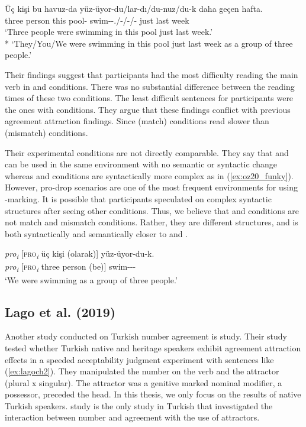 \ea \label{ex:oz20}
    \gll \"U\c{c} ki\c{s}i bu havuz-da y\"uz-\"uyor-{du/lar-d{\i}/du-nuz/du-k} daha ge\c{c}en hafta.\\
    three person this pool-\Loc{} swim-\Impf-{\Pst.\Tsg/\Tpl-\Pst/\Pst-\Spl/\Pst-\Fpl} just last week\\
    \glt `Three people were swimming in this pool just last week.'\\*
    `They/You/We were swimming in this pool just last week as a group of three people.'
\z

Their findings suggest that participants had the most difficulty reading the main verb in \Spl{} and \Tpl{} conditions. There was no substantial difference between the reading times of these two conditions. The least difficult sentences for participants were the ones with \Tsg{} conditions. They argue that these findings conflict with previous agreement attraction findings. Since \Tpl{} (match) conditions read slower than \Tsg{} (mismatch) conditions.

Their experimental conditions are not directly comparable. They say that \Tsg{} and \Tpl{} can be used in the same environment with no semantic or syntactic change whereas \Fpl{} and \Spl{} conditions are syntactically more complex as in (\ref{ex:oz20_funky}). However, pro-drop scenarios are one of the most frequent environments for using \Tpl{}-marking. It is possible that participants speculated on complex syntactic structures after seeing other conditions. Thus, we believe that \Tpl{} and \Tsg{} conditions are not match and mismatch conditions. Rather, they are different structures, and \Tpl{} is both syntactically and semantically closer to \Fpl{} and \Spl{}.

\ea \label{ex:oz20_funky}
    \gll \emph{pro\textsubscript{\it i}} [\textsc{pro}\textsubscript{\it i} \"u\c{c} ki\c{s}i (olarak)] y\"uz-\"uyor-du-k.\\ 
    \emph{pro\textsubscript{\it i}} [\textsc{pro}\textsubscript{\it i} three person (be)] swim-\Impf-\Pst-\Fpl{}\\
    \glt `We were swimming as a group of three people.'
\z

\subsection{Lago et al. (2019)}

Another study conducted on Turkish number agreement is \cites{LagoEtAl2019} study. Their study tested whether Turkish native and heritage speakers exhibit agreement attraction effects in a speeded acceptability judgment experiment with sentences like (\ref{ex:lagoch2}). They manipulated the number on the verb and the attractor (plural x singular). The attractor was a genitive marked nominal modifier, a possessor, preceded the head. In this thesis, we only focus on the results of native Turkish speakers. \cites{LagoEtAl2019} study is the only study in Turkish that investigated the interaction between number and agreement with the use of attractors. 


